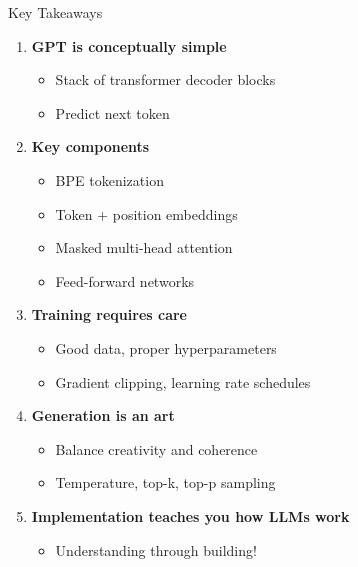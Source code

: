 \documentclass[aspectratio=169]{beamer}
\begin{document}
\begin{frame}[shrink=10]{Key Takeaways 🔑}
    \begin{enumerate}\setlength{\itemsep}{0pt}
        \item \textbf{GPT is conceptually simple}
        \begin{itemize}\setlength{\itemsep}{0pt}
            \item Stack of transformer decoder blocks
            \item Predict next token
        \end{itemize}

        \vspace{0.3cm}

        \item \textbf{Key components}
        \begin{itemize}\setlength{\itemsep}{0pt}
            \item BPE tokenization
            \item Token + position embeddings
            \item Masked multi-head attention
            \item Feed-forward networks
        \end{itemize}

        \vspace{0.3cm}

        \item \textbf{Training requires care}
        \begin{itemize}\setlength{\itemsep}{0pt}
            \item Good data, proper hyperparameters
            \item Gradient clipping, learning rate schedules
        \end{itemize}

        \vspace{0.3cm}

        \item \textbf{Generation is an art}
        \begin{itemize}\setlength{\itemsep}{0pt}
            \item Balance creativity and coherence
            \item Temperature, top-k, top-p sampling
        \end{itemize}

        \vspace{0.3cm}

        \item \textbf{Implementation teaches you how LLMs work}
        \begin{itemize}\setlength{\itemsep}{0pt}
            \item Understanding through building!
        \end{itemize}
    \end{enumerate}
\end{frame}
\end{document}

